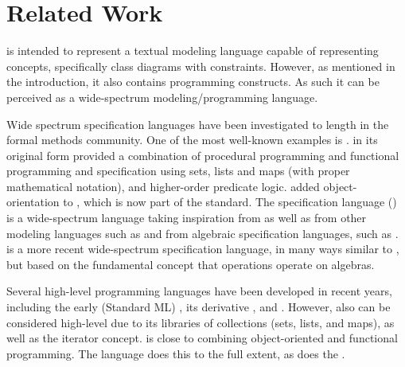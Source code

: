 
\section{Related Work}
\label{sec:related-work}

\Klang{} is intended to represent a textual modeling language capable of representing \sysml{} concepts, specifically class diagrams with constraints.
However, as mentioned in the introduction, it also contains programming constructs.
As such it can be perceived as a wide-spectrum modeling/programming language.

Wide spectrum specification languages have been investigated to length in the formal 
methods community. One of the most well-known examples is \vdm{} 
\cite{vdm78,bjoerner-jones-82,jones90,jones-shaw-90}. \vdm{} in its
original form \cite{vdm78} provided a combination of procedural programming and
functional programming and specification using sets, lists and maps (with proper 
mathematical notation), and higher-order predicate logic. \vdmpp{} 
\cite{vdmplusplus05} added object-orientation to \vdm{}, which is now part of
the \vdm{} standard. The \raiselang{} specification language (\rsl{})
\cite{raise92} is a wide-spectrum language taking inspiration from \vdm{} as well as 
from other modeling languages such as \zlang{} and from algebraic specification 
languages, such as \clear{}. \asml{} \cite{asml05} is a more recent wide-spectrum
specification language, in many ways similar to \vdm{}, but based on the fundamental concept that operations operate on algebras.

Several high-level programming languages have been developed in recent years,
including  the early \sml{} (Standard ML) \cite{standard-ml-97}, its derivative
\ocaml{} \cite{ocaml}, and \haskell{} \cite{haskell}. However, also \java{}
can be considered high-level due to its libraries of collections (sets, lists, and 
maps), as well as the iterator concept. \python{} \cite{python} is close to 
combining object-oriented and functional programming. The 
\scala{} \cite{scala} language does this to the full extent, as does the
\fortress{} \cite{fortress}.

